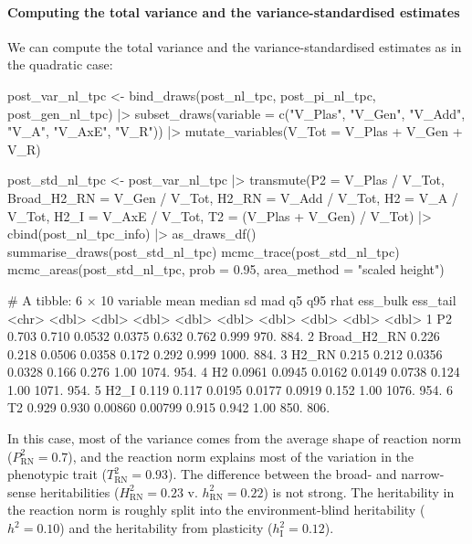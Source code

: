 \documentclass[a4paper,12pt,twoside]{article}
\begin{document}
\paragraph{Computing the total variance and the variance-standardised estimates}
We can compute the total variance and the variance-standardised estimates as in the quadratic case:
\begin{Rinput}
post_var_nl_tpc <-
    bind_draws(post_nl_tpc, post_pi_nl_tpc, post_gen_nl_tpc) |>
    subset_draws(variable = c("V_Plas", "V_Gen", "V_Add", "V_A", "V_AxE", "V_R")) |>
    mutate_variables(V_Tot = V_Plas + V_Gen + V_R)

post_std_nl_tpc <-
    post_var_nl_tpc |>
    transmute(P2            = V_Plas / V_Tot,
              Broad_H2_RN   = V_Gen / V_Tot,
              H2_RN         = V_Add / V_Tot,
              H2            = V_A / V_Tot,
              H2_I          = V_AxE / V_Tot,
              T2            = (V_Plas + V_Gen) / V_Tot) |>
    cbind(post_nl_tpc_info) |>
    as_draws_df()
summarise_draws(post_std_nl_tpc)
mcmc_trace(post_std_nl_tpc)
mcmc_areas(post_std_nl_tpc,
           prob = 0.95,
           area_method = "scaled height")
\end{Rinput}
\begin{Routput}
# A tibble: 6 × 10
  variable      mean median      sd     mad     q5   q95  rhat ess_bulk ess_tail
  <chr>        <dbl>  <dbl>   <dbl>   <dbl>  <dbl> <dbl> <dbl>    <dbl>    <dbl>
1 P2          0.703  0.710  0.0532  0.0375  0.632  0.762 0.999     970.     884.
2 Broad_H2_RN 0.226  0.218  0.0506  0.0358  0.172  0.292 0.999    1000.     884.
3 H2_RN       0.215  0.212  0.0356  0.0328  0.166  0.276 1.00     1074.     954.
4 H2          0.0961 0.0945 0.0162  0.0149  0.0738 0.124 1.00     1071.     954.
5 H2_I        0.119  0.117  0.0195  0.0177  0.0919 0.152 1.00     1076.     954.
6 T2          0.929  0.930  0.00860 0.00799 0.915  0.942 1.00      850.     806.
\end{Routput}
In this case, most of the variance comes from the average shape of reaction norm ($P^{2}_{\text{RN}}=0.7$), and the reaction norm explains most of the variation in the phenotypic trait ($T^{2}_{\text{RN}}=0.93$). The difference between the broad- and narrow-sense heritabilities ($H^{2}_{\text{RN}}=0.23$ v. $h^{2}_{\text{RN}}=0.22$) is not strong. The heritability in the reaction norm is roughly split into the environment-blind heritability  ($h^{2}=0.10$) and the heritability from plasticity ($h^{2}_{\text{I}}=0.12$).
%
\end{document}
